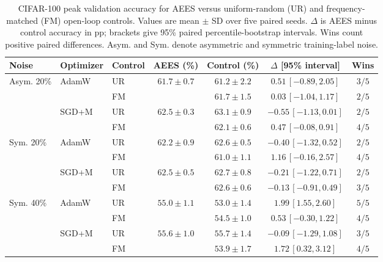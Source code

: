 \begin{table}[thbp]
\centering
\caption{CIFAR-100 peak validation accuracy for AEES versus uniform-random
(UR) and frequency-matched (FM) open-loop controls. Values are mean
\(\pm\) SD over five paired seeds. \(\Delta\) is AEES minus control accuracy
in pp; brackets give 95\% paired percentile-bootstrap intervals. Wins count
positive paired differences. Asym. and Sym. denote asymmetric and symmetric
training-label noise.}
\label{tab:cifar-open-loop}
\footnotesize
\setlength{\tabcolsep}{2.2pt}
\renewcommand{\arraystretch}{1.08}
\begin{tabular*}{\linewidth}{@{\extracolsep{\fill}}lllcccc@{}}
\toprule
Noise & Optimizer & Control & AEES (\%) & Control (\%) &
\(\Delta\) [95\% interval] & Wins \\
\midrule
\multirow{4}{*}{Asym. 20\%}
& \multirow{2}{*}{AdamW}
& UR & \multirow{2}{*}{\(61.7\pm0.7\)}
& \(61.2\pm2.2\) & \(0.51\,[-0.89,2.05]\) & \(3/5\) \\
& & FM & & \(61.7\pm1.5\) & \(0.03\,[-1.04,1.17]\) & \(2/5\) \\
\cmidrule(lr){2-7}
& \multirow{2}{*}{SGD+M}
& UR & \multirow{2}{*}{\(62.5\pm0.3\)}
& \(63.1\pm0.9\) & \(-0.55\,[-1.13,0.01]\) & \(2/5\) \\
& & FM & & \(62.1\pm0.6\) & \(0.47\,[-0.08,0.91]\) & \(4/5\) \\
\midrule
\multirow{4}{*}{Sym. 20\%}
& \multirow{2}{*}{AdamW}
& UR & \multirow{2}{*}{\(62.2\pm0.9\)}
& \(62.6\pm0.5\) & \(-0.40\,[-1.32,0.52]\) & \(2/5\) \\
& & FM & & \(61.0\pm1.1\) & \(1.16\,[-0.16,2.57]\) & \(4/5\) \\
\cmidrule(lr){2-7}
& \multirow{2}{*}{SGD+M}
& UR & \multirow{2}{*}{\(62.5\pm0.5\)}
& \(62.7\pm0.8\) & \(-0.21\,[-1.22,0.71]\) & \(2/5\) \\
& & FM & & \(62.6\pm0.6\) & \(-0.13\,[-0.91,0.49]\) & \(3/5\) \\
\midrule
\multirow{4}{*}{Sym. 40\%}
& \multirow{2}{*}{AdamW}
& UR & \multirow{2}{*}{\(55.0\pm1.1\)}
& \(53.0\pm1.4\) & \(1.99\,[1.55,2.60]\) & \(5/5\) \\
& & FM & & \(54.5\pm1.0\) & \(0.53\,[-0.30,1.22]\) & \(4/5\) \\
\cmidrule(lr){2-7}
& \multirow{2}{*}{SGD+M}
& UR & \multirow{2}{*}{\(55.6\pm1.0\)}
& \(55.7\pm1.4\) & \(-0.09\,[-1.29,1.08]\) & \(3/5\) \\
& & FM & & \(53.9\pm1.7\) & \(1.72\,[0.32,3.12]\) & \(4/5\) \\
\bottomrule
\end{tabular*}
\end{table}
